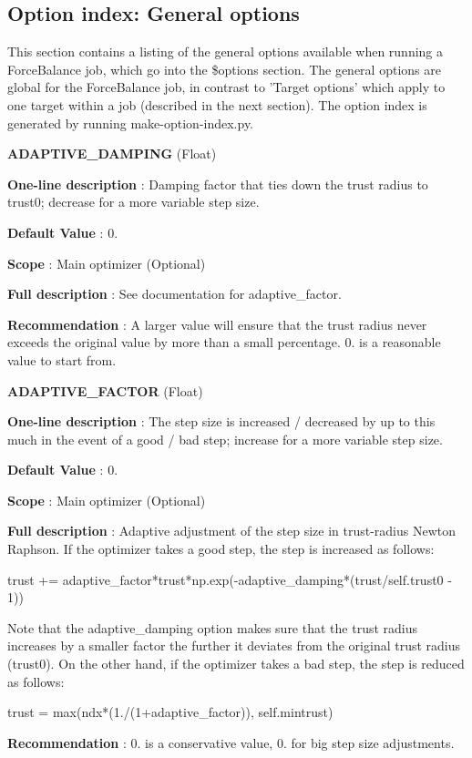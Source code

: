\hypertarget{glossary_gen_option_index}{}\subsection{Option index\-: General options}\label{glossary_gen_option_index}
This section contains a listing of the general options available when running a Force\-Balance job, which go into the \$options section. The general options are global for the Force\-Balance job, in contrast to 'Target options' which apply to one target within a job (described in the next section). The option index is generated by running make-\/option-\/index.\-py.

\begin{DoxyItemize}
\item {\bfseries  A\-D\-A\-P\-T\-I\-V\-E\-\_\-\-D\-A\-M\-P\-I\-N\-G } (Float) \par
{\bfseries  One-\/line description }\-: Damping factor that ties down the trust radius to trust0; decrease for a more variable step size. \par
{\bfseries  Default Value }\-: 0. \par
{\bfseries  Scope }\-: Main optimizer (Optional) \par
{\bfseries  Full description }\-: See documentation for adaptive\-\_\-factor. \par
{\bfseries  Recommendation }\-: A larger value will ensure that the trust radius never exceeds the original value by more than a small percentage. 0. is a reasonable value to start from.\end{DoxyItemize}
\begin{DoxyItemize}
\item {\bfseries  A\-D\-A\-P\-T\-I\-V\-E\-\_\-\-F\-A\-C\-T\-O\-R } (Float) \par
{\bfseries  One-\/line description }\-: The step size is increased / decreased by up to this much in the event of a good / bad step; increase for a more variable step size. \par
{\bfseries  Default Value }\-: 0. \par
{\bfseries  Scope }\-: Main optimizer (Optional) \par
{\bfseries  Full description }\-: Adaptive adjustment of the step size in trust-\/radius Newton Raphson. If the optimizer takes a good step, the step is increased as follows\-: \begin{DoxyVerb}trust += adaptive_factor*trust*np.exp(-adaptive_damping*(trust/self.trust0 - 1))
\end{DoxyVerb}
 Note that the adaptive\-\_\-damping option makes sure that the trust radius increases by a smaller factor the further it deviates from the original trust radius (trust0). On the other hand, if the optimizer takes a bad step, the step is reduced as follows\-: \begin{DoxyVerb}trust = max(ndx*(1./(1+adaptive_factor)), self.mintrust)
\end{DoxyVerb}
\end{DoxyItemize}
\par
{\bfseries  Recommendation }\-: 0. is a conservative value, 0. for big step size adjustments.


